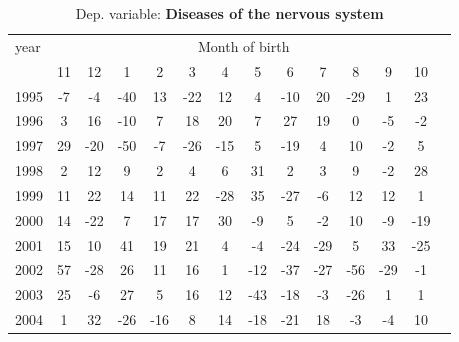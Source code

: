 \begin{table}[H] \begin{threeparttable} \centering \caption{Dep. variable: \textbf{Diseases of the nervous system}} {\def\sym#1{\ifmmode^{#1}\else\(^{#1}\)\fi} \begin{tabular}{l*{13}{c}} \toprule year & \multicolumn{12}{c}{Month of birth} \\ \cmidrule(lr){2-13} 
            &          11&          12&           1&           2&           3&           4&           5&           6&           7&           8&           9&          10\\
1995        &          -7&          -4&         -40&          13&         -22&          12&           4&         -10&          20&         -29&           1&          23\\
1996        &           3&          16&         -10&           7&          18&          20&           7&          27&          19&           0&          -5&          -2\\
1997        &          29&         -20&         -50&          -7&         -26&         -15&           5&         -19&           4&          10&          -2&           5\\
1998        &           2&          12&           9&           2&           4&           6&          31&           2&           3&           9&          -2&          28\\
1999        &          11&          22&          14&          11&          22&         -28&          35&         -27&          -6&          12&          12&           1\\
2000        &          14&         -22&           7&          17&          17&          30&          -9&           5&          -2&          10&          -9&         -19\\
2001        &          15&          10&          41&          19&          21&           4&          -4&         -24&         -29&           5&          33&         -25\\
2002        &          57&         -28&          26&          11&          16&           1&         -12&         -37&         -27&         -56&         -29&          -1\\
2003        &          25&          -6&          27&           5&          16&          12&         -43&         -18&          -3&         -26&           1&           1\\
2004        &           1&          32&         -26&         -16&           8&          14&         -18&         -21&          18&          -3&          -4&          10\\

\end{tabular}}
\end{threeparttable}
\end{table}
